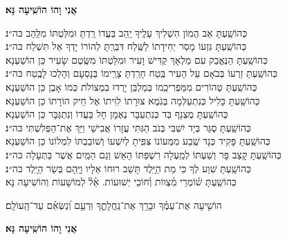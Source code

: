 \documentclass[twoside, openany, parskip=half, 11pt]{book}
\begin{document}
\begin{large}
\textbf{אֲנִי וָהוֹ הוֹשִֽׁיעָה נָּא׃}
\end{large}

\begin{small}
כְּהוֹשַֽׁעְתָּ אַב הֲמוֹן הִשְׁלִיךְ עָלֶֽיךָ יַֽהַב בַּעֲדוֹ רַֽדְתָּ וּמִלַּטְתּוֹ מִלַּֽהַב \hfill כּה״נ׃\\
כְּהוֹשַֽׁעְתָּ גִּזְעוֹ מָסַר יְחִידָתוֹ לַשֶּֽׁלַח דִּבַּרְֽתָּ לְהוֹרוֹ יָדְךָ אַל תִּשְׁלַח \hfill כּה״נ׃ \\
כְּהוֹשַֽׁעְתָּ הַנֶּאֱבַק עִם מַלְאָךְ קַדִּישׁ וָעִיר וּמִלַּטְתּוֹ מִשֶּֽׂטֶם שָׂעִיר \hfill כֵּן הוֹשַׁעְנָא׃ \\
כְּהוֹשַֽׁעְתָּ זַרְעוֹ בְּבֹאָם עַל הָעִיר בֶּֽטַח חָרַֽדְתָּ צָרֵֽימוֹ בְּנָסְעָם וְהָלְכוּ לָבֶֽטַח \hfill כּה״נ׃ \\
כְּהוֹשַֽׁעְתָּ טְהוֹרִים מִמַּפְרִיכֵֽמוֹ בְּמַלְבֵּן יָרְדוּ בִמְצוֹלֹת כְּמוֹ אָבֶן \hfill כֵּן הוֹשַׁעְנָא׃ \\
כְּהוֹשַֽׁעְתָּ כָּלִיל כְּנִתְעַלְּמָה בְּגֹֽמֶא צוּרָתוֹ לִוִּיתוֹ אֶל חֵיק הוֹרָתוֹ \hfill כֵּן הוֹשַׁעְנָא׃ \\
כְּהוֹשַֽׁעְתָּ מֻצְנָף בַּד כְּנִתְעַבָּר נֶאֶמָן חָל בַּעֲדוֹ וְנִתְגַּבָּר \hfill כֵּן הוֹשַׁעְנָא׃ \\
כְּהוֹשַֽׁעְתָּ סֻגַּר בְּיַד יִשְׁבִּי בְּנֹב הַגִּתִּי עֲזָרוֹ אֲבִישַׁי וַיַּךְ אֶת־הַפְּלִשְׁתִּי \hfill כּה״נ׃\\
כְּהוֹשַֽׁעְתָּ פָּקִיד כְּנָד שֶֽׁבַע מִמְּעוֹנוֹ צִּפִּֽיתָ לְיִשְׁעוֹ וְשׁוֹבַבְתּוֹ לִמְלוֹנוֹ \hfill כֵּן הוֹשַׁעְנָא׃\\
כְּהוֹשַֽׁעְתָּ קָצַב פָּר וְשַׁעְתּוֹ לְמַֽעְלָה רִשְׁפַּתּוֹ הָאֵשׁ וְגַם הַמַּֽיִם אֲשֶׁר בַּתְּעָלָה \hfill כּה״נ׃\\
כְּהוֹשַֽׁעְתָּ שִׁוַע לְךָ כִּי מֵת הַיָּֽלֶד תָּשֵׁב רוּחוֹ אֵלָיו וַיָּֽהָם בְּשַׂר הַיָּֽלֶד \hfill כּה״נ׃\\
כְּהוֹשַֽׁעְתָּ שׁ֗וֹמְרֵי מִ֗צְווֹת וְ֗חוֹכֵי יְשׁוּעוֹת. אֵ֗ל֗ לְמוֹשָׁעוֹת \hfill וְהוֹשִׁיעָה נָּא׃\\

\end{small}

הוֹשִׁ֤יעָה אֶת־עַמֶּ֗ךָ וּבָרֵ֥ךְ אֶת־נַֽחֲלָתֶ֑ךָ וּֽרְעֵ֥ם וְ֝נַשְּׂאֵ֗ם עַד־הָֽעוֹלָֽם׃


\begin{large}
\textbf{אֲנִי וָהוֹ הוֹשִֽׁיעָה נָּא׃}
\end{large}
\end{document}
